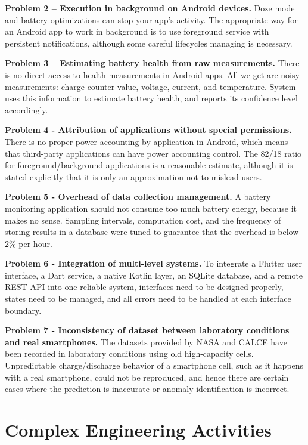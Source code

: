 \documentclass[12pt,a4paper]{report}
\begin{document}
\textbf{Problem 2 – Execution in background on Android devices.}
Doze mode and battery optimizations can stop your app's activity. The appropriate way for an Android app to work in background is to use foreground service with persistent notifications, although some careful lifecycles managing is necessary.

\textbf{Problem 3 – Estimating battery health from raw measurements.}
There is no direct access to health measurements in Android apps. All we get are noisy measurements: charge counter value, voltage, current, and temperature. System uses this information to estimate battery health, and reports its confidence level accordingly.

\textbf{Problem 4 - Attribution of applications without special permissions.}
There is no proper power accounting by application in Android, which means that third-party applications can have power accounting control. The 82/18 ratio for foreground/background applications is a reasonable estimate, although it is stated explicitly that it is only an approximation not to mislead users.

\textbf{Problem 5 - Overhead of data collection management.}
A battery monitoring application should not consume too much battery energy, because it makes no sense. Sampling intervals, computation cost, and the frequency of storing results in a database were tuned to guarantee that the overhead is below 2\% per hour.

\textbf{Problem 6 - Integration of multi-level systems.}
To integrate a Flutter user interface, a Dart service, a native Kotlin layer, an SQLite database, and a remote REST API into one reliable system, interfaces need to be designed properly, states need to be managed, and all errors need to be handled at each interface boundary.

\textbf{Problem 7 - Inconsistency of dataset between laboratory conditions and real smartphones.}
The datasets provided by NASA and CALCE have been recorded in laboratory conditions using old high-capacity cells. Unpredictable charge/discharge behavior of a smartphone cell, such as it happens with a real smartphone, could not be reproduced, and hence there are certain cases where the prediction is inaccurate or anomaly identification is incorrect.

\section{Complex Engineering Activities}
\end{document}
